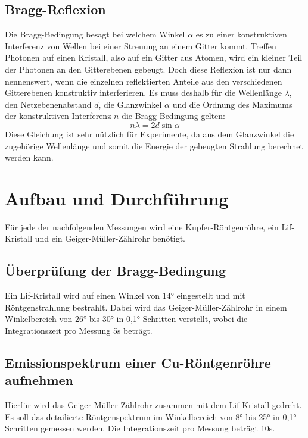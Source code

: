 \documentclass[titlepage = firstcover]{scrartcl}
\begin{document}
      \subsection{Bragg-Reflexion}
        Die Bragg-Bedingung besagt bei welchem Winkel $\alpha$ es zu einer konstruktiven Interferenz von Wellen bei einer Streuung an einem Gitter kommt. Treffen Photonen auf einen Kristall, also auf ein Gitter aus Atomen, wird ein kleiner Teil der Photonen an den Gitterebenen gebeugt. Doch diese Reflexion ist nur dann nennenswert, wenn die einzelnen reflektierten Anteile aus den verschiedenen Gitterebenen konstruktiv interferieren. Es muss deshalb für die Wellenlänge $\lambda$, den Netzebenenabstand $d$, die Glanzwinkel $\alpha$ und die Ordnung des Maximums der konstruktiven Interferenz $n$ die Bragg-Bedingung gelten:
        \begin{equation}
          n \lambda = 2 d \sin{\alpha}
          \label{eqn:bragg}
        \end{equation}
        Diese Gleichung ist sehr nützlich für Experimente, da aus dem Glanzwinkel die zugehörige Wellenlänge und somit die Energie der gebeugten Strahlung berechnet werden kann.

    \section{Aufbau und Durchführung}
      Für jede der nachfolgenden Messungen wird eine Kupfer-Röntgenröhre, ein Lif-Kristall und ein Geiger-Müller-Zählrohr benötigt.
      
      \subsection{Überprüfung der Bragg-Bedingung} \label{sec:braggmessung}
        Ein Lif-Kristall wird auf einen Winkel von 14° eingestellt und mit Röntgenstrahlung bestrahlt. Dabei wird das Geiger-Müller-Zählrohr in einem Winkelbereich von 26° bis 30° in 0,1° Schritten verstellt, wobei die Integrationszeit pro Messung 5s beträgt.

      \subsection{Emissionspektrum einer Cu-Röntgenröhre aufnehmen} \label{sec:emissionmessung}
        Hierfür wird das Geiger-Müller-Zählrohr zusammen mit dem Lif-Kristall gedreht. Es soll das detailierte Röntgenspektrum im Winkelbereich von 8° bis 25° in 0,1° Schritten gemessen werden. Die Integrationszeit pro Messung beträgt 10s.
      
\end{document}
